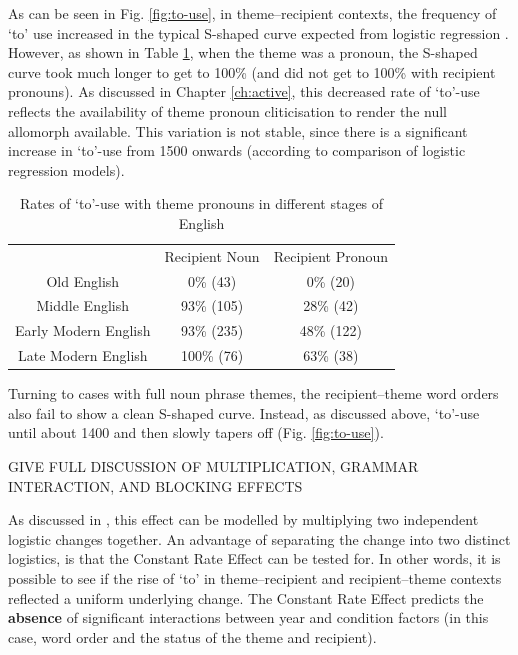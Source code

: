 	As can be seen in Fig. \ref{fig:to-use}, in theme--recipient contexts, the frequency of `to' use increased in the typical S-shaped curve expected from logistic regression \citep{Kroch.1989}. However, as shown in Table \ref{tab:tp-to-rates}, when the theme was a pronoun, the S-shaped curve took much longer to get to 100\% (and did not get to 100\% with recipient pronouns). As discussed in Chapter \ref{ch:active}, this decreased rate of `to'-use reflects the availability of theme pronoun cliticisation to render the null allomorph available. This variation is not stable, since there is a significant increase in `to'-use from 1500 onwards (according to comparison of logistic regression models). 

	\begin{table}[ht!]
		\begin{tabular}{ccc}
						& Recipient Noun & Recipient Pronoun\\
			Old English		& 0\% (43) & 0\% (20) \\
			Middle English		& 93\% (105) & 28\% (42) \\
			Early Modern English	& 93\% (235) & 48\% (122) \\
			Late Modern English	& 100\% (76) & 63\% (38) \\
		\end{tabular}
		\caption{Rates of `to'-use with theme pronouns in different stages of English}
		\label{tab:tp-to-rates}
	\end{table}

	Turning to cases with full noun phrase themes, the recipient--theme word orders also fail to show a clean S-shaped curve. Instead, as discussed above, `to'-use until about 1400 and then slowly tapers off (Fig. \ref{fig:to-use}). 
	
	GIVE FULL DISCUSSION OF MULTIPLICATION, GRAMMAR INTERACTION, AND BLOCKING EFFECTS

	As discussed in \cite{Bacovcin.2016}, this effect can be modelled by multiplying two independent logistic changes together. An advantage of separating the change into two distinct logistics, is that the Constant Rate Effect can be tested for. In other words, it is possible to see if the rise of `to' in theme--recipient and recipient--theme contexts reflected a uniform underlying change. The Constant Rate Effect predicts the \textbf{absence} of significant interactions between year and condition factors (in this case, word order and the status of the theme and recipient). 

